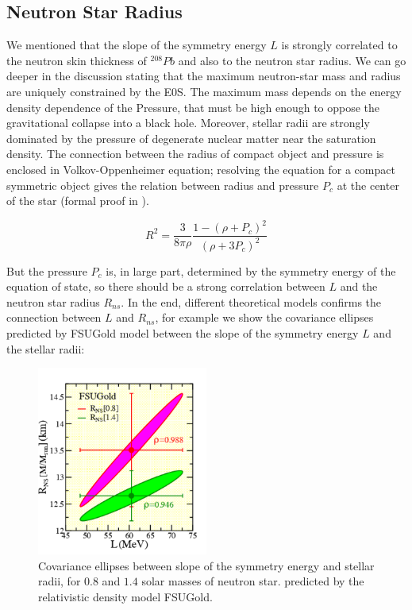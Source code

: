 \subsection{Neutron Star Radius}

We mentioned that the slope of the symmetry energy $L$ is strongly correlated to the neutron skin thickness of $^{208}Pb$ and also to the neutron star radius. We can go deeper in the discussion stating that the maximum neutron-star mass and radius are uniquely constrained by the E0S. The maximum mass depends on the energy density dependence of the Pressure, that must be high enough to oppose the gravitational collapse into a black hole. Moreover, stellar radii are strongly dominated by the pressure of degenerate nuclear matter near the saturation density.  
The connection between the radius of compact object and pressure is enclosed in Volkov-Oppenheimer equation; resolving the equation 
for a compact symmetric object gives the relation between radius and pressure $P_{c}$ at the center of the star (formal proof in \cite{LATTIMER_2007}).

\begin{equation}
R^{2} = \dfrac{3}{8\pi \rho} \dfrac{1 - (\rho + P_{c})^{2}}{(\rho + 3 P_{c})^{2}}
\end{equation}

But the pressure $P_{c}$ is, in large part, determined by the symmetry energy of the equation of state, so there should be a strong correlation between $L$ and the neutron star radius $R_{ns}$. In the end, different theoretical models \cite{PhysRevLett.95.122501} confirms the connection between $L$ and $R_{ns}$, for example we show the covariance ellipses predicted by FSUGold model between the slope of the symmetry energy $L$ and the stellar radii:

\begin{figure}[hbtp]
\centering
\includegraphics[width = 0.5\textwidth]{Introduzione/LvsRns.pdf}
\caption{Covariance ellipses between slope of the symmetry energy and stellar radii, for $0.8$ and $1.4$ solar masses of neutron star. predicted by the relativistic density model FSUGold.}
\end{figure}

